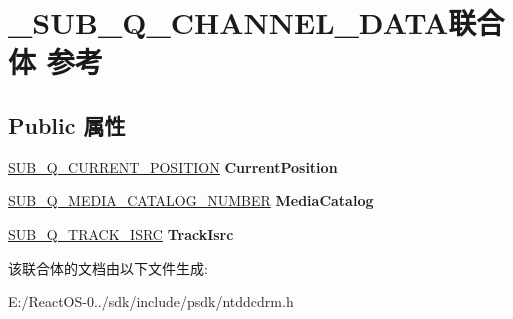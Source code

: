 \hypertarget{union___s_u_b___q___c_h_a_n_n_e_l___d_a_t_a}{}\section{\+\_\+\+S\+U\+B\+\_\+\+Q\+\_\+\+C\+H\+A\+N\+N\+E\+L\+\_\+\+D\+A\+T\+A联合体 参考}
\label{union___s_u_b___q___c_h_a_n_n_e_l___d_a_t_a}
\subsection*{Public 属性}
\begin{DoxyCompactItemize}
\item 
\mbox{\label{union___s_u_b___q___c_h_a_n_n_e_l___d_a_t_a_a62cb7e445ba63023267ca87fd99fcacc}} 
\hyperlink{struct___s_u_b___q___c_u_r_r_e_n_t___p_o_s_i_t_i_o_n}{S\+U\+B\+\_\+\+Q\+\_\+\+C\+U\+R\+R\+E\+N\+T\+\_\+\+P\+O\+S\+I\+T\+I\+ON} {\bfseries Current\+Position}
\item 
\mbox{\label{union___s_u_b___q___c_h_a_n_n_e_l___d_a_t_a_a0fd5d691dce561906e84e4f483868097}} 
\hyperlink{struct___s_u_b___q___m_e_d_i_a___c_a_t_a_l_o_g___n_u_m_b_e_r}{S\+U\+B\+\_\+\+Q\+\_\+\+M\+E\+D\+I\+A\+\_\+\+C\+A\+T\+A\+L\+O\+G\+\_\+\+N\+U\+M\+B\+ER} {\bfseries Media\+Catalog}
\item 
\mbox{\label{union___s_u_b___q___c_h_a_n_n_e_l___d_a_t_a_a235eab3fe025d634c76114ac5b3d2fa8}} 
\hyperlink{struct___s_u_b___q___t_r_a_c_k___i_s_r_c}{S\+U\+B\+\_\+\+Q\+\_\+\+T\+R\+A\+C\+K\+\_\+\+I\+S\+RC} {\bfseries Track\+Isrc}
\end{DoxyCompactItemize}


该联合体的文档由以下文件生成\+:\begin{DoxyCompactItemize}
\item 
E\+:/\+React\+O\+S-\/0../sdk/include/psdk/ntddcdrm.\+h\end{DoxyCompactItemize}
